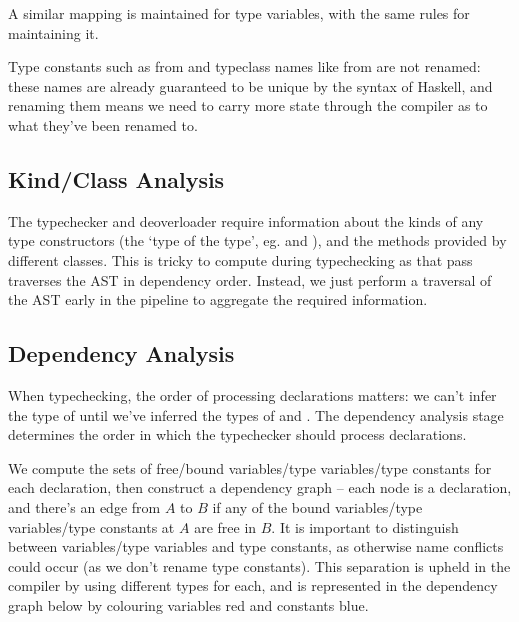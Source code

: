 \documentclass[dissertation.tex]{subfiles}
\begin{document}
{{{            A similar mapping is maintained for type variables, with the same rules for maintaining it.

            Type constants such as  from  and typeclass names like
             from  are not renamed: these names are already guaranteed to be
            unique by the syntax of Haskell, and renaming them means we need to carry more state through the compiler as
            to what they've been renamed to.

        }
        \subsection{Kind/Class Analysis}
        {

            The typechecker and deoverloader require information about the kinds of any type constructors (the `type of
            the type', eg.  and ), and the methods provided by different
            classes. This is tricky to compute during typechecking as that pass traverses the AST in dependency order.
            Instead, we just perform a traversal of the AST early in the pipeline to aggregate the required information.

        }
        \subsection{Dependency Analysis}
        {

            When typechecking, the order of processing declarations matters: we can't infer the type of  until we've inferred the types of  and . The dependency analysis stage
            determines the order in which the typechecker should process declarations.
            
            We compute the sets of free/bound variables/type variables/type constants for each declaration, then
            construct a dependency graph -- each node is a declaration, and there's an edge from \(A\) to \(B\) if any
            of the bound variables/type variables/type constants at \(A\) are free in \(B\). It is important to
            distinguish between variables/type variables and type constants, as otherwise name conflicts could occur (as
            we don't rename type constants). This separation is upheld in the compiler by using different types for
            each, and is represented in the dependency graph below by colouring variables red and constants blue.
            
}}}
\end{document}
